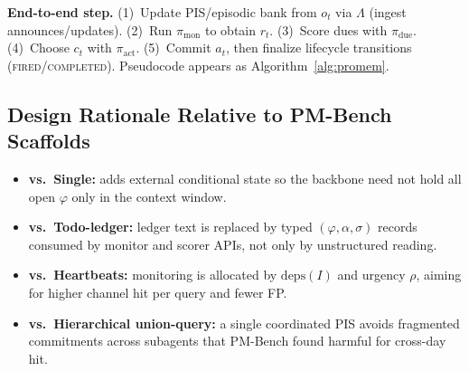 \noindent\textbf{End-to-end step.}
(1)~Update PIS/episodic bank from $o_t$ via $\Lambda$ (ingest announces/updates). (2)~Run $\pi_{\mathrm{mon}}$ to obtain $r_t$. (3)~Score dues with $\pi_{\mathrm{due}}$. (4)~Choose $c_t$ with $\pi_{\mathrm{act}}$. (5)~Commit $a_t$, then finalize lifecycle transitions (\textsc{fired}/\textsc{completed}). Pseudocode appears as Algorithm~\ref{alg:promem}.

\subsection{Design Rationale Relative to PM-Bench Scaffolds}
\label{sec:rationale}

\begin{itemize}
    \item \textbf{vs.\ Single:} adds external conditional state so the backbone need not hold all open $\varphi$ only in the context window.
    \item \textbf{vs.\ Todo-ledger:} ledger text is replaced by typed $(\varphi,\alpha,\sigma)$ records consumed by monitor and scorer APIs, not only by unstructured reading.
    \item \textbf{vs.\ Heartbeats:} monitoring is allocated by $\mathrm{deps}(I)$ and urgency $\rho$, aiming for higher channel hit per query and fewer FP.
    \item \textbf{vs.\ Hierarchical union-query:} a single coordinated PIS avoids fragmented commitments across subagents that PM-Bench found harmful for cross-day hit.
\end{itemize}
